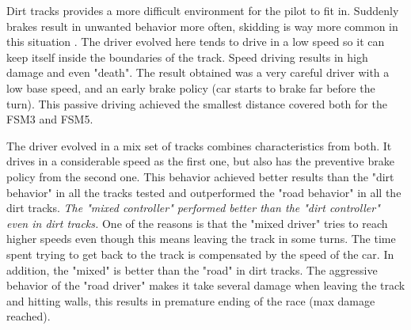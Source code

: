 	Dirt tracks provides a more difficult environment for the pilot to fit in. Suddenly brakes result in unwanted behavior more often, skidding is way more common in this situation . The driver evolved here tends to drive in a low speed so it can keep itself inside the boundaries of the track. Speed driving results in high damage and even  "death". The result obtained was a very careful driver with a low base speed, and an early brake policy (car starts to brake far before the turn). This passive driving achieved the smallest distance covered both for the FSM3 and FSM5.
	
	The driver evolved in a mix set of tracks combines characteristics from both. It drives in a considerable speed as the first one, but also has the preventive brake policy from the second one. This behavior achieved better results than the "dirt behavior" in all the tracks tested and outperformed the "road behavior" in all the dirt tracks. \emph{The "mixed controller" performed better than the "dirt controller" even in dirt tracks.} One of the reasons is that the "mixed driver" tries to reach higher speeds even though this means leaving the track in some turns. The time spent trying to get back to the track is compensated by the speed of the car. In addition, the "mixed" is better than the "road" in dirt tracks. The aggressive behavior of the "road driver" makes it take several damage when leaving the track and hitting walls, this results in premature ending of the race (max damage reached).
	
